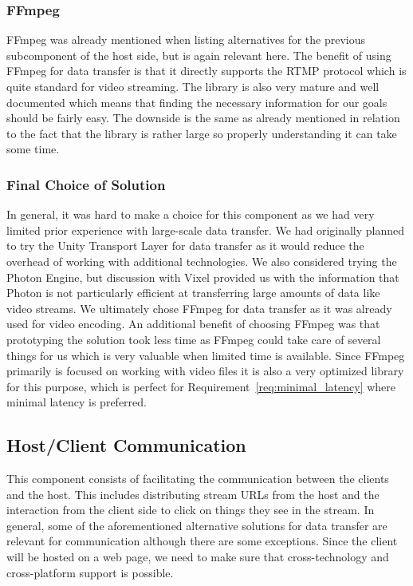 \subsubsection{FFmpeg}
FFmpeg was already mentioned when listing alternatives for the previous subcomponent of the host side, but is again relevant here. The benefit of using FFmpeg for data transfer is that it directly supports the RTMP protocol which is quite standard for video streaming. The library is also very mature and well documented which means that finding the necessary information for our goals should be fairly easy. The downside is the same as already mentioned in relation to the fact that the library is rather large so properly understanding it can take some time. 

\subsubsection{Final Choice of Solution}
In general, it was hard to make a choice for this component as we had very limited prior experience with large-scale data transfer. We had originally planned to try the Unity Transport Layer for data transfer as it would reduce the overhead of working with additional technologies. We also considered trying the Photon Engine, but discussion with Vixel provided us with the information that Photon is not particularly efficient at transferring large amounts of data like video streams. We ultimately chose FFmpeg for data transfer as it was already used for video encoding. An additional benefit of choosing FFmpeg was that prototyping the solution took less time as FFmpeg could take care of several things for us which is very valuable when limited time is available. Since FFmpeg primarily is focused on working with video files it is also a very optimized library for this purpose, which is perfect for Requirement~\ref{req:minimal_latency} where minimal latency is preferred.

\subsection{Host/Client Communication} %
This component consists of facilitating the communication between the clients and the host. This includes distributing stream URLs from the host and the interaction from the client side to click on things they see in the stream. In general, some of the aforementioned alternative solutions for data transfer are relevant for communication although there are some exceptions. Since the client will be hosted on a web page, we need to make sure that cross-technology and cross-platform support is possible. 
    
